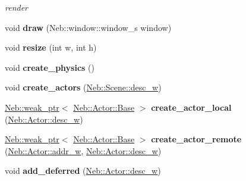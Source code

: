 \begin{DoxyCompactItemize}
\begin{DoxyCompactList}\small\item\em render \end{DoxyCompactList}\item 
\hypertarget{classNeb_1_1Scene_1_1scene_a0499b9871487c91029c418d40e79eddb}{void {\bfseries draw} (\-Neb\-::window\-::window\-\_\-s window)}\label{classNeb_1_1Scene_1_1scene_a0499b9871487c91029c418d40e79eddb}

\item 
\hypertarget{classNeb_1_1Scene_1_1scene_aff3b39ef52ea118f99a2e02e3ff819d9}{void {\bfseries resize} (int w, int h)}\label{classNeb_1_1Scene_1_1scene_aff3b39ef52ea118f99a2e02e3ff819d9}

\item 
\hypertarget{classNeb_1_1Scene_1_1scene_a8212512abd9a873de8e31a81d8b01ea9}{void {\bfseries create\-\_\-physics} ()}\label{classNeb_1_1Scene_1_1scene_a8212512abd9a873de8e31a81d8b01ea9}

\item 
\hypertarget{classNeb_1_1Scene_1_1scene_a45bdec98ff1510610a384b23ddb4f5ee}{void {\bfseries create\-\_\-actors} (\hyperlink{classNeb_1_1weak__ptr}{\-Neb\-::\-Scene\-::desc\-\_\-w})}\label{classNeb_1_1Scene_1_1scene_a45bdec98ff1510610a384b23ddb4f5ee}

\item 
\hypertarget{classNeb_1_1Scene_1_1scene_ab8d68d80d7c845309f4963ba05e51c53}{\hyperlink{classNeb_1_1weak__ptr}{\-Neb\-::weak\-\_\-ptr}$<$ \hyperlink{classNeb_1_1Actor_1_1Base}{\-Neb\-::\-Actor\-::\-Base} $>$ {\bfseries create\-\_\-actor\-\_\-local} (\hyperlink{classNeb_1_1weak__ptr}{\-Neb\-::\-Actor\-::desc\-\_\-w})}\label{classNeb_1_1Scene_1_1scene_ab8d68d80d7c845309f4963ba05e51c53}

\item 
\hypertarget{classNeb_1_1Scene_1_1scene_a480cf2b9eea6e92a87833c1016574951}{\hyperlink{classNeb_1_1weak__ptr}{\-Neb\-::weak\-\_\-ptr}$<$ \hyperlink{classNeb_1_1Actor_1_1Base}{\-Neb\-::\-Actor\-::\-Base} $>$ {\bfseries create\-\_\-actor\-\_\-remote} (\hyperlink{classNeb_1_1weak__ptr}{\-Neb\-::\-Actor\-::addr\-\_\-w}, \hyperlink{classNeb_1_1weak__ptr}{\-Neb\-::\-Actor\-::desc\-\_\-w})}\label{classNeb_1_1Scene_1_1scene_a480cf2b9eea6e92a87833c1016574951}

\item 
\hypertarget{classNeb_1_1Scene_1_1scene_a8bbe83d2c4cede51faf7b8044e27f425}{void {\bfseries add\-\_\-deferred} (\hyperlink{classNeb_1_1weak__ptr}{\-Neb\-::\-Actor\-::desc\-\_\-w})}\label{classNeb_1_1Scene_1_1scene_a8bbe83d2c4cede51faf7b8044e27f425}


\end{DoxyCompactItemize}
